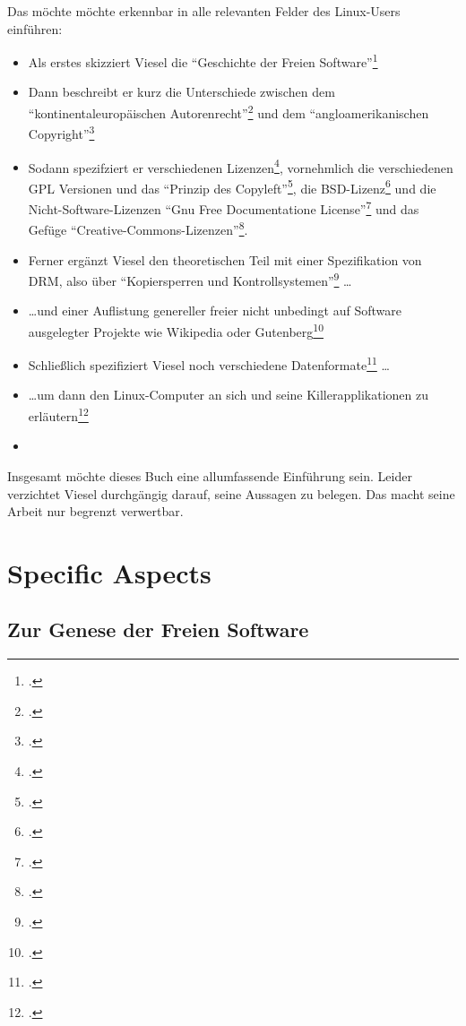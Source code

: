 \documentclass[DIV=calc,BCOR=5mm,11pt,headings=small,oneside,abstract=true, toc=bib]{scrartcl}
\begin{document}
Das möchte möchte erkennbar in alle relevanten Felder des Linux-Users einführen:
\begin{itemize}
  \item Als erstes skizziert Viesel die \enquote{Geschichte der Freien
  Software}\footcite[vgl.][11ff]{Viesel2006a}
  \item Dann beschreibt er kurz die Unterschiede zwischen dem
  \enquote{kontinentaleuropäischen
  Autorenrecht}\footcite[vgl.][46ff]{Viesel2006a} und dem
  \enquote{angloamerikanischen Copyright}\footcite[vgl.][53ff]{Viesel2006a}
  \item Sodann spezifziert er verschiedenen
  Lizenzen\footcite[vgl.][58ff]{Viesel2006a}, vornehmlich die
  verschiedenen GPL Versionen und das \enquote{Prinzip des
  Copyleft}\footcite[vgl.][60ff]{Viesel2006a}, die
  BSD-Lizenz\footcite[vgl.][67f]{Viesel2006a} und die Nicht-Software-Lizenzen
  \enquote{Gnu Free Documentatione
  License}\footcite[vgl.][68f]{Viesel2006a} und das Gefüge
  \enquote{Creative-Commons-Lizenzen}\footcite[vgl.][69ff]{Viesel2006a}.
  \item Ferner ergänzt Viesel den theoretischen Teil mit einer
  Spezifikation von DRM, also über \enquote{Kopiersperren und
  Kontrollsystemen}\footcite[vgl.][69ff]{Viesel2006a} \ldots
  \item \ldots und einer Auflistung genereller freier nicht unbedingt auf
  Software ausgelegter Projekte wie Wikipedia oder
  Gutenberg\footcite[vgl.][88ff]{Viesel2006a}
  \item Schließlich spezifiziert Viesel noch verschiedene
  Datenformate\footcite[vgl.][113ff]{Viesel2006a} \ldots
  \item \ldots um dann den Linux-Computer an sich und seine
  Killerapplikationen zu erläutern\footcite[vgl.][141ff]{Viesel2006a}
  \item 
\end{itemize}
Insgesamt möchte dieses Buch eine allumfassende Einführung sein. Leider
verzichtet Viesel durchgängig darauf, seine Aussagen zu belegen. Das macht seine
Arbeit nur begrenzt verwertbar.

\section{Specific Aspects}

\subsection{Zur Genese der Freien Software}
\end{document}
